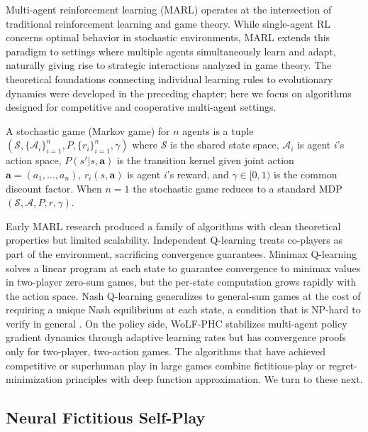 Multi-agent reinforcement learning (MARL) operates at the intersection of traditional reinforcement learning and game theory. While single-agent RL concerns optimal behavior in stochastic environments, MARL extends this paradigm to settings where multiple agents simultaneously learn and adapt, naturally giving rise to strategic interactions analyzed in game theory. The theoretical foundations connecting individual learning rules to evolutionary dynamics were developed in the preceding chapter; here we focus on algorithms designed for competitive and cooperative multi-agent settings.

A stochastic game (Markov game) for $n$ agents is a tuple $(\mathcal{S}, \{\mathcal{A}_i\}_{i=1}^n, P, \{r_i\}_{i=1}^n, \gamma)$ where $\mathcal{S}$ is the shared state space, $\mathcal{A}_i$ is agent $i$'s action space, $P(s' | s, \mathbf{a})$ is the transition kernel given joint action $\mathbf{a} = (a_1, \ldots, a_n)$, $r_i(s, \mathbf{a})$ is agent $i$'s reward, and $\gamma \in [0,1)$ is the common discount factor. When $n = 1$ the stochastic game reduces to a standard MDP $(\mathcal{S}, \mathcal{A}, P, r, \gamma)$.

Early MARL research produced a family of algorithms with clean theoretical properties but limited scalability. Independent Q-learning \citep{Tan1993} treats co-players as part of the environment, sacrificing convergence guarantees. Minimax Q-learning \citep{littman1994_minimaxq} solves a linear program at each state to guarantee convergence to minimax values in two-player zero-sum games, but the per-state computation grows rapidly with the action space. Nash Q-learning \citep{hu2003_nashq} generalizes to general-sum games at the cost of requiring a unique Nash equilibrium at each state, a condition that is NP-hard to verify in general \citep{Daskalakis2009}. On the policy side, WoLF-PHC \citep{BowlingVeloso2002} stabilizes multi-agent policy gradient dynamics through adaptive learning rates but has convergence proofs only for two-player, two-action games. The algorithms that have achieved competitive or superhuman play in large games combine fictitious-play or regret-minimization principles with deep function approximation. We turn to these next.

\subsection{Neural Fictitious Self-Play}

